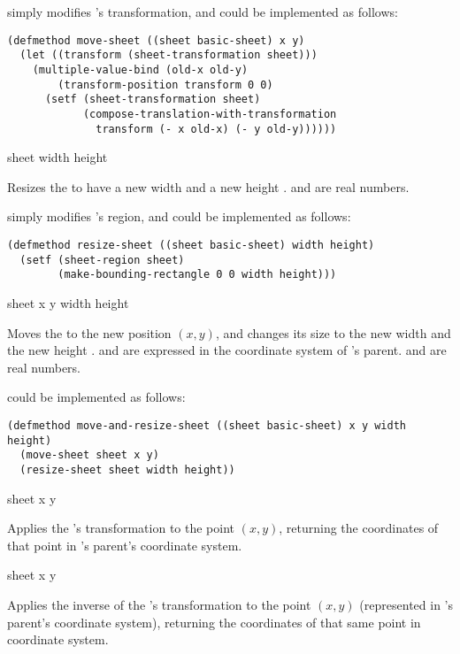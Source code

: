  simply modifies 's transformation, and could be
implemented as follows:

\begin{verbatim}
(defmethod move-sheet ((sheet basic-sheet) x y)
  (let ((transform (sheet-transformation sheet)))
    (multiple-value-bind (old-x old-y)
        (transform-position transform 0 0)
      (setf (sheet-transformation sheet)
            (compose-translation-with-transformation
              transform (- x old-x) (- y old-y))))))
\end{verbatim}

 {sheet width height}

Resizes the   to have a new width  and a new
height .   and  are real numbers.

 simply modifies 's region, and could be implemented
as follows:

\begin{verbatim}
(defmethod resize-sheet ((sheet basic-sheet) width height)
  (setf (sheet-region sheet)
        (make-bounding-rectangle 0 0 width height)))
\end{verbatim}


 {sheet x y width height}

Moves the   to the new position $(x,y)$, and changes its
size to the new width  and the new height .   and
 are expressed in the coordinate system of 's parent.
 and  are real numbers.

 could be implemented as follows:

\begin{verbatim}
(defmethod move-and-resize-sheet ((sheet basic-sheet) x y width height)
  (move-sheet sheet x y)
  (resize-sheet sheet width height))
\end{verbatim}


 {sheet x y}

Applies the  's transformation to the point $(x,y)$,
returning the coordinates of that point in 's parent's coordinate
system.

 {sheet x y}

Applies the inverse of the  's transformation to the
point $(x,y)$ (represented in 's parent's coordinate system),
returning the coordinates of that same point in  coordinate system.

